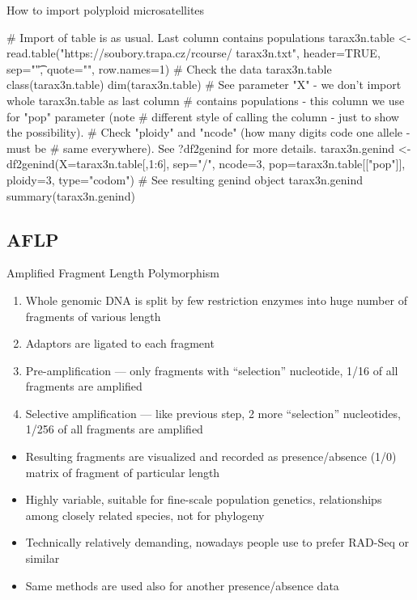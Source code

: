 \documentclass[compress, ucs, xelatex, 11pt, xcolor=svgnames, aspectratio=169,
	hyperref={
		bookmarks=true,
		unicode=true,
		colorlinks=true,
		pdftitle={Molecular data in R},
		plainpages=false,
		pdfauthor={Vojtech Zeisek},
		pdfsubject={Course about phylogeny and evolution in R},
		pdfcreator={XeLaTeX},
		pdfkeywords={R, evolution, phylogeny, molecular data},
		linkcolor=Crimson, %
		anchorcolor=Magenta, %
		citecolor=Magenta, %
		filecolor=Magenta, %
		menucolor=Magenta, %
		urlcolor=DodgerBlue, %
		pdftex},
	url={hyphens, lowtilde} %
	]{beamer}
\begin{document}
\begin{frame}[fragile]{How to import polyploid microsatellites}
	\begin{spluscode}
    # Import of table is as usual. Last column contains populations
    tarax3n.table <- read.table("https://soubory.trapa.cz/rcourse/
      tarax3n.txt", header=TRUE, sep="\t", quote="", row.names=1)
    # Check the data
    tarax3n.table
    class(tarax3n.table)
    dim(tarax3n.table)
    # See parameter "X" - we don't import whole tarax3n.table as last column
    # contains populations - this column we use for "pop" parameter (note
    # different style of calling the column - just to show the possibility).
    # Check "ploidy" and "ncode" (how many digits code one allele - must be
    # same everywhere). See ?df2genind for more details.
    tarax3n.genind <- df2genind(X=tarax3n.table[,1:6], sep="/", ncode=3,
      pop=tarax3n.table[["pop"]], ploidy=3, type="codom")
    # See resulting genind object
    tarax3n.genind
    summary(tarax3n.genind)
	\end{spluscode}
\end{frame}

\subsection{AFLP}

\begin{frame}{Amplified Fragment Length Polymorphism}
	\begin{enumerate}
		\item Whole genomic DNA is split by few restriction enzymes into huge number of fragments of various length
		\item Adaptors are ligated to each fragment
		\item Pre-amplification --- only fragments with \enquote{selection} nucleotide, 1/16 of all fragments are amplified
		\item Selective amplification --- like previous step, 2 more \enquote{selection} nucleotides, 1/256 of all fragments are amplified
	\end{enumerate}
	\begin{itemize}
		\item Resulting fragments are visualized and recorded as presence/absence (1/0) matrix of fragment of particular length
		\item Highly variable, suitable for fine-scale population genetics, relationships among closely related species, not for phylogeny
		\item Technically relatively demanding, nowadays people use to prefer RAD-Seq or similar
		\item Same methods are used also for another presence/absence data
	\end{itemize}
\end{frame}
\end{document}

